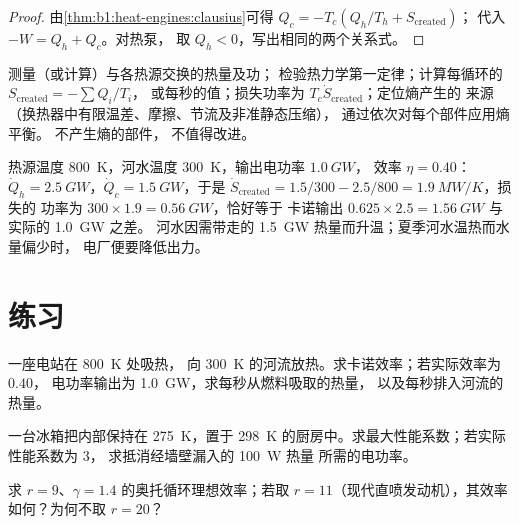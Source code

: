 \begin{proof}
由\cref{thm:b1:heat-engines:clausius}可得 $Q_c = -T_c(Q_h/T_h + S_{\mathrm{created}})$；
代入 $-W = Q_h + Q_c$。对热泵，
取 $Q_h < 0$，写出相同的两个关系式。
\end{proof}

\begin{method}[热机的审计]\label{meth:b1:heat-engines:audit}
测量（或计算）与各热源交换的热量及功；
检验热力学第一定律；计算每循环的 $S_{\mathrm{created}} = -\sum Q_i/T_i$，
或每秒的值；损失功率为 $T_c\dot S_{\mathrm{created}}$；定位熵产生的
来源（换热器中有限温差、摩擦、节流及非准静态压缩），
通过依次对每个部件应用熵平衡。
不产生熵的部件，
不值得改进。
\end{method}

\begin{example}[一座电站的审计]\label{ex:b1:heat-engines:audit}
热源温度 \qty{800}{K}，河水温度 \qty{300}{K}，输出电功率 $\qty{1.0}{GW}$，
效率 $\eta = 0.40$：$\dot Q_h = \qty{2.5}{GW}$，$\dot Q_c = \qty{1.5}{GW}$，于是
$\dot S_{\mathrm{created}} = 1.5/300 - 2.5/800 = \qty{1.9}{MW/K}$，损失的
功率为 $300 \times 1.9 = \qty{0.56}{GW}$，恰好等于
卡诺输出 $0.625 \times 2.5 = \qty{1.56}{GW}$ 与实际的 \qty{1.0}{GW} 之差。
河水因需带走的 \qty{1.5}{GW} 热量而升温；夏季河水温热而水量偏少时，
电厂便要降低出力。
\end{example}

\section{练习}

\begin{exercise}[$\star$]\label{exo:b1:heat-engines:1}
一座电站在 \qty{800}{K} 处吸热，
向 \qty{300}{K} 的河流放热。求卡诺效率；若实际效率为 $0.40$，
电功率输出为 \qty{1.0}{GW}，求每秒从燃料吸取的热量，
以及每秒排入河流的热量。
\end{exercise}

\begin{exercise}[$\star$]\label{exo:b1:heat-engines:2}
一台冰箱把内部保持在 \qty{275}{K}，置于
\qty{298}{K} 的厨房中。求最大性能系数；若实际性能系数为 $3$，
求抵消经墙壁漏入的 \qty{100}{W} 热量
所需的电功率。
\end{exercise}

\begin{exercise}[$\star$]\label{exo:b1:heat-engines:3}
求 $r = 9$、$\gamma = 1.4$ 的奥托循环理想效率；若取
$r = 11$（现代直喷发动机），其效率如何？为何不取 $r = 20$？
\end{exercise}

